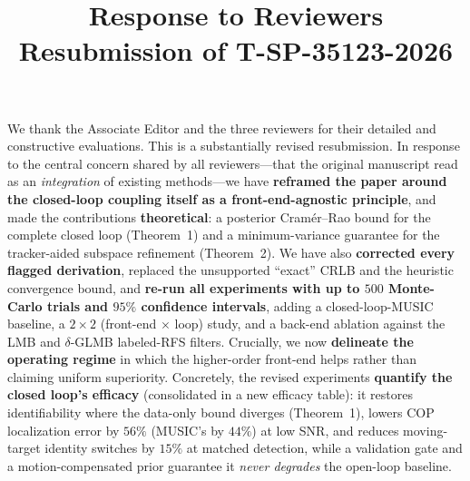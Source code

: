 \documentclass[11pt]{article}
\title{Response to Reviewers\\\large Resubmission of T-SP-35123-2026}
\date{}
\begin{document}
\maketitle

We thank the Associate Editor and the three reviewers for their detailed and
constructive evaluations. This is a substantially revised resubmission. In
response to the central concern shared by all reviewers---that the original
manuscript read as an \emph{integration} of existing methods---we have
\textbf{reframed the paper around the closed-loop coupling itself as a
front-end-agnostic principle}, and made the contributions \textbf{theoretical}:
a posterior Cram\'er--Rao bound for the complete closed loop (Theorem~1) and a
minimum-variance guarantee for the tracker-aided subspace refinement
(Theorem~2). We have also \textbf{corrected every flagged derivation}, replaced
the unsupported ``exact'' CRLB and the heuristic convergence bound, and
\textbf{re-run all experiments with up to $500$ Monte-Carlo trials and $95\%$
confidence intervals}, adding a closed-loop-MUSIC baseline, a
$2\times2$ (front-end $\times$ loop) study, and a back-end ablation against the
LMB and $\delta$-GLMB labeled-RFS filters. Crucially, we now \textbf{delineate
the operating regime} in which the higher-order front-end helps rather than
claiming uniform superiority. Concretely, the revised experiments
\textbf{quantify the closed loop's efficacy} (consolidated in a new efficacy
table): it restores identifiability where the data-only bound diverges
(Theorem~1), lowers COP localization error by $56\%$ (MUSIC's by $44\%$) at low
SNR, and reduces moving-target identity switches by $15\%$ at matched detection,
while a validation gate and a motion-compensated prior guarantee it
\emph{never degrades} the open-loop baseline.
\end{document}
